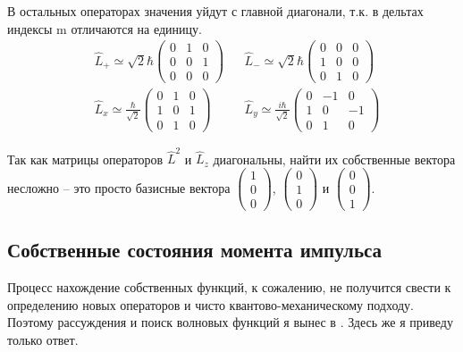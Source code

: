 В остальных операторах значения уйдут с главной диагонали, т.к. в дельтах индексы m отличаются на единицу.
\begin{align*}
&\hat{L}_+  \simeq  \sqrt{2}\hbar \left(\begin{array}{ccc} 0 & 1 & 0 \\ 0 & 0 & 1 \\ 0 & 0 & 0 \end{array} \right) & &\hat{L}_-  \simeq  \sqrt{2}\hbar \left(\begin{array}{ccc} 0 & 0 & 0 \\ 1 & 0 & 0 \\ 0 & 1 & 0 \end{array} \right)\\
&\hat{L}_x  \simeq  \frac{\hbar}{\sqrt{2}} \left(\begin{array}{ccc} 0 & 1 & 0 \\ 1 & 0 & 1 \\ 0 & 1 & 0 \end{array} \right) & &\hat{L}_y  \simeq  \frac{i\hbar}{\sqrt{2}} \left(\begin{array}{ccc} 0 & -1 & 0 \\ 1 & 0 & -1 \\ 0 & 1 & 0 \end{array} \right)
\end{align*}

Так как матрицы операторов $\hat{L}^2$ и $\hat{L}_z$ диагональны, найти их собственные вектора несложно -- это просто базисные вектора $ \left(\begin{array}{c} 1 \\ 0  \\ 0  \end{array} \right)$, $ \left(\begin{array}{c} 0 \\ 1 \\ 0  \end{array} \right)$ и $ \left(\begin{array}{c} 0 \\ 0  \\ 1  \end{array} \right)$. 

\subsection{Собственные состояния момента импульса}
\hspace{1em} Процесс нахождение собственных функций, к сожалению, не получится свести к определению новых операторов и чисто квантово-механическому подходу. Поэтому рассуждения и поиск волновых функций я вынес в . Здесь же я приведу только ответ.

